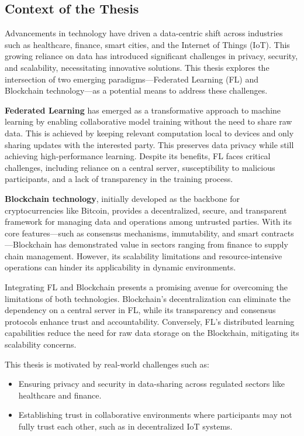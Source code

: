 \subsection{Context of the Thesis}\label{chap:contextandobjectives}
Advancements in technology have driven a data-centric shift across industries such as healthcare, finance,
smart cities, and the Internet of Things (IoT). This growing reliance on data has introduced significant
challenges in privacy, security, and scalability, necessitating innovative solutions. This thesis explores
the intersection of two emerging paradigms—Federated Learning (FL) and Blockchain technology—as a potential
means to address these challenges.

\textbf{Federated Learning} has emerged as a transformative approach to machine learning by enabling
collaborative model training without the need to share raw data. This is achieved by keeping relevant
computation local to devices and only sharing updates with the interested party.
This preserves data privacy while still achieving high-performance learning. Despite its benefits, FL faces
critical challenges, including reliance on a central server, susceptibility to malicious participants, and a
lack of transparency in the training process.

\textbf{Blockchain technology}, initially developed as the backbone for cryptocurrencies like Bitcoin,
provides a decentralized, secure, and transparent framework for managing data and operations among untrusted
parties. With its core features—such as consensus mechanisms, immutability, and smart contracts—Blockchain
has demonstrated value in sectors ranging from finance to supply chain management. However, its scalability
limitations and resource-intensive operations can hinder its applicability in dynamic environments.

Integrating FL and Blockchain presents a promising avenue for overcoming the limitations of both
technologies. Blockchain's decentralization can eliminate the dependency on a central server in FL, while its
transparency and consensus protocols enhance trust and accountability. Conversely, FL's distributed learning
capabilities reduce the need for raw data storage on the Blockchain, mitigating its scalability concerns.

This thesis is motivated by real-world challenges such as:
\begin{itemize}
  \item Ensuring privacy and security in data-sharing across regulated sectors like healthcare and finance.
  \item Establishing trust in collaborative environments where participants may not fully trust each other,
    such as in decentralized IoT systems.
\end{itemize}

